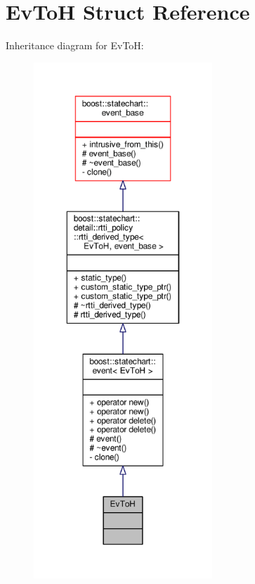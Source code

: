 \hypertarget{struct_ev_to_h}{}\section{Ev\+ToH Struct Reference}
\label{struct_ev_to_h}


Inheritance diagram for Ev\+ToH\+:
\nopagebreak
\begin{figure}[H]
\begin{center}
\leavevmode
\includegraphics[height=550pt]{struct_ev_to_h__inherit__graph}
\end{center}
\end{figure}


